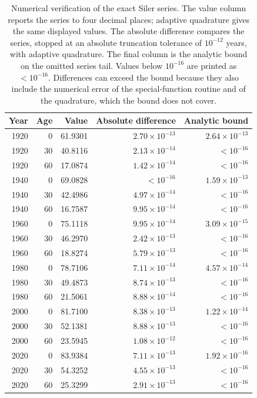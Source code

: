 \begin{table}[htb!]
\centering
\small
\caption{Numerical verification of the exact Siler series. The value column reports the series to four decimal places; adaptive quadrature gives the same displayed values. The absolute difference compares the series, stopped at an absolute truncation tolerance of $10^{-12}$ years, with adaptive quadrature. The final column is the analytic bound on the omitted series tail. Values below $10^{-16}$ are printed as $<10^{-16}$. Differences can exceed the bound because they also include the numerical error of the special-function routine and of the quadrature, which the bound does not cover.}
\label{tab:numerical-verification}
\begin{tabular}{rrrrr}
\toprule
Year & Age & Value & Absolute difference & Analytic bound \\
\midrule
1920 & 0 & 61.9301 & $2.70\times 10^{-13}$ & $2.64\times 10^{-13}$ \\
1920 & 30 & 40.8116 & $2.13\times 10^{-14}$ & $<10^{-16}$ \\
1920 & 60 & 17.0874 & $1.42\times 10^{-14}$ & $<10^{-16}$ \\
1940 & 0 & 69.0828 & $<10^{-16}$ & $1.59\times 10^{-13}$ \\
1940 & 30 & 42.4986 & $4.97\times 10^{-14}$ & $<10^{-16}$ \\
1940 & 60 & 16.7587 & $9.95\times 10^{-14}$ & $<10^{-16}$ \\
1960 & 0 & 75.1118 & $9.95\times 10^{-14}$ & $3.09\times 10^{-15}$ \\
1960 & 30 & 46.2970 & $2.42\times 10^{-13}$ & $<10^{-16}$ \\
1960 & 60 & 18.8274 & $5.79\times 10^{-13}$ & $<10^{-16}$ \\
1980 & 0 & 78.7106 & $7.11\times 10^{-14}$ & $4.57\times 10^{-14}$ \\
1980 & 30 & 49.4873 & $8.74\times 10^{-13}$ & $<10^{-16}$ \\
1980 & 60 & 21.5061 & $8.88\times 10^{-14}$ & $<10^{-16}$ \\
2000 & 0 & 81.7100 & $8.38\times 10^{-13}$ & $1.22\times 10^{-14}$ \\
2000 & 30 & 52.1381 & $8.88\times 10^{-13}$ & $<10^{-16}$ \\
2000 & 60 & 23.5945 & $1.08\times 10^{-12}$ & $<10^{-16}$ \\
2020 & 0 & 83.9384 & $7.11\times 10^{-13}$ & $1.92\times 10^{-16}$ \\
2020 & 30 & 54.3252 & $4.55\times 10^{-13}$ & $<10^{-16}$ \\
2020 & 60 & 25.3299 & $2.91\times 10^{-13}$ & $<10^{-16}$ \\
\bottomrule
\end{tabular}
\end{table}
